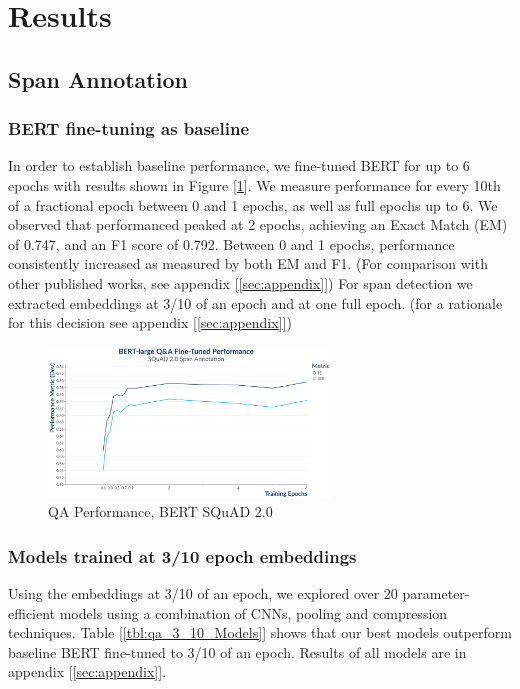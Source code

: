 \section{Results}

\subsection{Span Annotation}
\subsubsection{BERT fine-tuning as baseline}
In order to establish baseline performance, we fine-tuned BERT for up to 6 epochs with results shown in Figure [\ref{fig:QnABertPerformance}]. We measure performance for every 10th of a fractional epoch between 0 and 1 epochs, as well as full epochs up to 6. We observed that performanced peaked at 2 epochs, achieving an Exact Match (EM) of 0.747, and an F1 score of 0.792. Between 0 and 1 epochs, performance consistently increased as measured by  both EM and F1. (For comparison with other published works, see appendix [\ref{sec:appendix}]) For span detection we extracted embeddings at 3/10 of an epoch and at one full epoch. (for a rationale for this decision see appendix [\ref{sec:appendix}])
\begin{figure}[ht]
	\centering
	\includegraphics[width=7.5cm]{images/QnA_BERT_Training_Performance_plot.png}
	\caption{\label{fig:QnABertPerformance}QA Performance, BERT SQuAD 2.0}
\end{figure}

\subsubsection{Models trained at 3/10 epoch embeddings}
Using the embeddings at 3/10 of an epoch, we explored over 20 parameter-efficient models using a combination of CNNs, pooling and compression techniques.  Table [\ref{tbl:qa_3_10_Models}] shows that our best models outperform baseline BERT fine-tuned to 3/10 of an epoch. Results of all models are in appendix [\ref{sec:appendix}].

